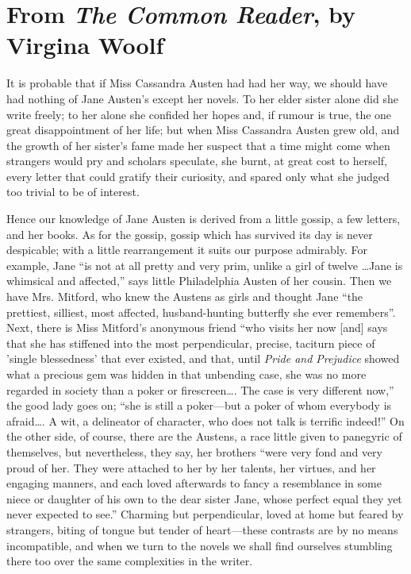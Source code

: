 \section{From \textit{The Common Reader}, by Virgina Woolf}

It is probable that if Miss Cassandra Austen had had her way, we should have had nothing of Jane Austen's except her novels. To her elder sister alone did she write freely; to her alone she confided her hopes and, if rumour is true, the one great disappointment of her life; but when Miss Cassandra Austen grew old, and the growth of her sister's fame made her suspect that a time might come when strangers would pry and scholars speculate, she burnt, at great cost to herself, every letter that could gratify their curiosity, and spared only what she judged too trivial to be of interest.

Hence our knowledge of Jane Austen is derived from a little gossip, a few letters, and her books. As for the gossip, gossip which has survived its day is never despicable; with a little rearrangement it suits our purpose admirably. For example, Jane ``is not at all pretty and very prim, unlike a girl of twelve \dots Jane is whimsical and affected,'' says little Philadelphia Austen of her cousin. Then we have Mrs. Mitford, who knew the Austens as girls and thought Jane ``the prettiest, silliest, most affected, husband-hunting butterfly she ever remembers''. Next, there is Miss Mitford's anonymous friend ``who visits her now [and] says that she has stiffened into the most perpendicular, precise, taciturn piece of 'single blessedness' that ever existed, and that, until \textit{Pride and Prejudice} showed what a precious gem was hidden in that unbending case, she was no more regarded in society than a poker or firescreen\dots . The case is very different now,'' the good lady goes on; ``she is still a poker—but a poker of whom everybody is afraid\dots . A wit, a delineator of character, who does not talk is terrific indeed!'' On the other side, of course, there are the Austens, a race little given to panegyric of themselves, but nevertheless, they say, her brothers ``were very fond and very proud of her. They were attached to her by her talents, her virtues, and her engaging manners, and each loved afterwards to fancy a resemblance in some niece or daughter of his own to the dear sister Jane, whose perfect equal they yet never expected to see.'' Charming but perpendicular, loved at home but feared by strangers, biting of tongue but tender of heart—these contrasts are by no means incompatible, and when we turn to the novels we shall find ourselves stumbling there too over the same complexities in the writer.

